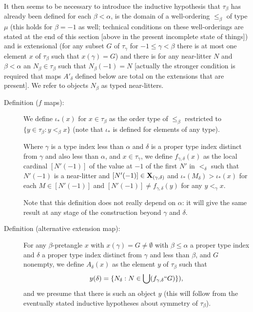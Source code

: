 \documentclass[112pt]{article}
\begin{document}
It then seems to be necessary to introduce the inductive hypothesis that $\tau_\beta$ has already been defined for each $\beta<\alpha$, is the domain of a well-ordering $\leq_\beta$ of type $\mu$ (this holds for $\beta=-1$ as well; technical conditions on these well-orderings are stated at the end of this section [above in the present incomplete state of things])
and is extensional (for any subset $G$ of $\tau_\gamma$ for $-1 \leq \gamma<\beta$ there is at most one element $x$ of $\tau_\beta$ such
that $x(\gamma)=G$) and there is for any near-litter $N$ and $\beta<\alpha$ an $N_\beta \in \tau_\beta$ such that $N_\beta(-1) = N$  [actually the stronger condition is required that maps $A'_\delta$ defined below are total on the extensions that are present].   We refer to objects $N_\beta$ as typed near-litters.

\begin{description}

\item[Definition ($f$ maps):]  

   We define $\iota_*(x)$ for $x \in \tau_\beta$ as the order type of $\leq_\beta$ restricted to $\{y \in \tau_\beta:y <_\beta x\}$ (note that $\iota_*$ is defined for elements of any type).

   Where $\gamma$ is a type index less than $\alpha$ and $\delta$ is a proper type index distinct from $\gamma$ and also less than $\alpha$, and $x \in \tau_\gamma$, we define $f_{\gamma,\delta}(x)$ as the local cardinal $[N'(-1)]$ of the value at $-1$ of the first $N'$ in $<_\delta$ such that $N'(-1)$ is a near-litter and $[N'(-1)] \in {\bf X}_{(\gamma,\delta)}$ and $\iota_*(M_\delta)>\iota_*(x)$  for each $M \in [N'(-1)]$ and $[N'(-1)] \neq f_{\gamma,\delta}(y)$ for any $y <_\gamma x$.  

Note that this definition does not really depend on $\alpha$:  it will give the same result at any stage of the construction beyond $\gamma$ and $\delta$.

\item[Definition (alternative extension map):]  For any $\beta$-pretangle $x$ with $x(\gamma)=G \neq \emptyset$ with $\beta \leq \alpha$ a proper type index and $\delta$ a proper type index distinct from $\gamma$ and less than $\beta$, and $G$ nonempty, we define
$A_\delta(x)$ as the element $y$ of $\tau_\beta$ such that $$y(\delta)= \{N_\delta:N \in \bigcup (f_{\gamma,\delta}``G)\}),$$ and we presume that there is such an object $y$ (this will follow from the eventually stated inductive hypotheses about symmetry of $\tau_\beta$).


\end{description}
\end{document}
